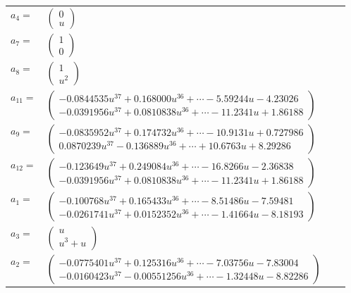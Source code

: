 \documentclass[1p]{elsarticle_modified}
\theoremstyle{definition}
\begin{document}
\begin{tabular}{m{7pt} m{180pt} m{7pt} m{180pt} }
\flushright $a_{4}=$&$\begin{pmatrix}0\\u\end{pmatrix}$ \\
\flushright $a_{7}=$&$\begin{pmatrix}1\\0\end{pmatrix}$ \\
\flushright $a_{8}=$&$\begin{pmatrix}1\\u^2\end{pmatrix}$ \\
\flushright $a_{11}=$&$\begin{pmatrix}-0.0844535 u^{37}+0.168000 u^{36}+\cdots-5.59244 u-4.23026\\-0.0391956 u^{37}+0.0810838 u^{36}+\cdots-11.2341 u+1.86188\end{pmatrix}$ \\
\flushright $a_{9}=$&$\begin{pmatrix}-0.0835952 u^{37}+0.174732 u^{36}+\cdots-10.9131 u+0.727986\\0.0870239 u^{37}-0.136889 u^{36}+\cdots+10.6763 u+8.29286\end{pmatrix}$ \\
\flushright $a_{12}=$&$\begin{pmatrix}-0.123649 u^{37}+0.249084 u^{36}+\cdots-16.8266 u-2.36838\\-0.0391956 u^{37}+0.0810838 u^{36}+\cdots-11.2341 u+1.86188\end{pmatrix}$ \\
\flushright $a_{1}=$&$\begin{pmatrix}-0.100768 u^{37}+0.165433 u^{36}+\cdots-8.51486 u-7.59481\\-0.0261741 u^{37}+0.0152352 u^{36}+\cdots-1.41664 u-8.18193\end{pmatrix}$ \\
\flushright $a_{3}=$&$\begin{pmatrix}u\\u^3+u\end{pmatrix}$ \\
\flushright $a_{2}=$&$\begin{pmatrix}-0.0775401 u^{37}+0.125316 u^{36}+\cdots-7.03756 u-7.83004\\-0.0160423 u^{37}-0.00551256 u^{36}+\cdots-1.32448 u-8.82286\end{pmatrix}$ \\

\end{tabular}
\end{document}
